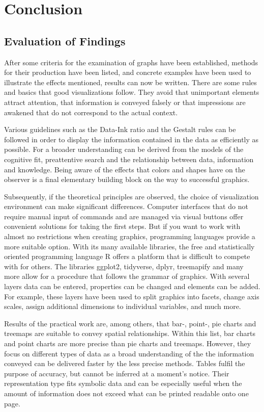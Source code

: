 \chapter{Conclusion}

\section{Evaluation of Findings}

After some criteria for the examination of graphs have been established, methods for their production have been listed, and concrete examples have been used to illustrate the effects mentioned, results can now be written. There are some rules and basics that good visualizations follow. They avoid that unimportant elements attract attention, that information is conveyed falsely or that impressions are awakened that do not correspond to the actual context.

Various guidelines such as the Data-Ink ratio and the Gestalt rules can be followed in order to display the information contained in the data as efficiently as possible. For a broader understanding can be derived from the models of the cognitive fit, preattentive search and the relationship between data, information and knowledge. Being aware of the effects that colors and shapes have on the observer is a final elementary building block on the way to successful graphics.

Subsequently, if the theoretical principles are observed, the choice of visualization environment can make significant differences. Computer interfaces that do not require manual input of commands and are managed via visual buttons offer convenient solutions for taking the first steps. But if you want to work with almost no restrictions when creating graphics, programming languages provide a more suitable option. With its many available libraries, the free and statistically oriented programming language R offers a platform that is difficult to compete with for others. The libraries ggplot2,  tidyverse, dplyr, treemapify and many more allow for a procedure that follows the grammar of graphics. With several layers data can be entered, properties can be changed and elements can be added. For example, these layers have been used to split graphics into facets, change axis scales, assign additional dimensions to individual variables, and much more.

Results of the practical work are, among others, that bar-, point-, pie charts and treemaps are suitable to convey spatial relationships. Within this list, bar charts and point charts are more precise than pie charts and treemaps. However, they focus on different types of data as a broad understanding of the the information conveyed can be delivered faster by the less precise methods. Tables fulfil the purpose of accuracy, but cannot be inferred at a moment's notice. Their representation type fits symbolic data and can be especially useful when the amount of information does not exceed what can be printed readable onto one page.

